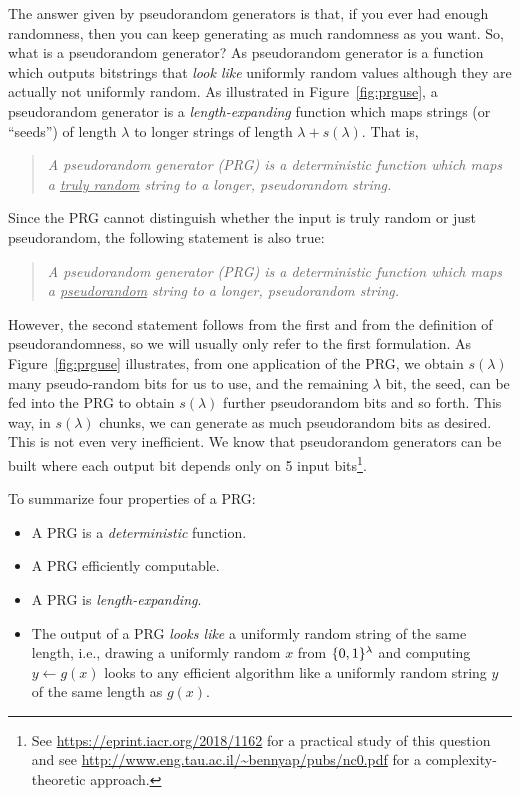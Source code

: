 \documentclass[a4paper,table,dvipsnames]{article}
\theoremstyle{definition}
\begin{document}
The answer given by pseudorandom generators is that, if you ever had enough
randomness, then you can keep generating as much randomness as you want. So,
what is a pseudorandom generator? As pseudorandom generator is a function which
outputs bitstrings that \emph{look like} uniformly random values although they
are actually not uniformly random. As illustrated in Figure~\ref{fig:prguse},
a pseudorandom generator is a \emph{length-expanding} function which maps
strings (or ``seeds'') of length $\lambda$ to longer strings of length $\lambda+s(\lambda)$.
That is,
\begin{quote}
  \textit{A pseudorandom generator (PRG) is a deterministic function which maps
	a \underline{truly random} string to a longer, pseudorandom string.}
\end{quote}
Since the PRG cannot distinguish whether the input is truly random or just
pseudorandom, the following statement is also true:
\begin{quote}
  \textit{A pseudorandom generator (PRG) is a deterministic function which maps
	a \underline{pseudorandom} string to a longer, pseudorandom string.}
\end{quote}
However, the second statement follows from the first and from the definition
of pseudorandomness, so we will usually only refer to the first formulation.
As Figure~\ref{fig:prguse} illustrates, from one application of the PRG, we
obtain $s(\lambda)$ many pseudo-random bits for us to use, and the remaining
$\lambda$ bit, the seed, can be fed into the PRG to obtain $s(\lambda)$ further
pseudorandom bits and so forth. This way, in $s(\lambda)$ chunks, we can generate
as much pseudorandom bits as desired. This is not even very inefficient. We know
that pseudorandom generators can be built where each output bit depends only on
5 input bits\footnote{See \url{https://eprint.iacr.org/2018/1162} for a practical
study of this question and see \url{http://www.eng.tau.ac.il/~bennyap/pubs/nc0.pdf}
for a complexity-theoretic approach.}.

To summarize four properties of a PRG:
\begin{itemize}
\item A PRG is a \emph{deterministic} function.
\item A PRG efficiently computable.
\item A PRG is \emph{length-expanding}.
\item The output of a PRG \emph{looks like} a uniformly random string of the same length, i.e., drawing a uniformly random $x$ from $\{0,1\}^\lambda$ and computing $y\gets g(x)$ looks to any efficient algorithm like a uniformly random string $y$ of the same length as $g(x)$.
\end{itemize}
\end{document}
